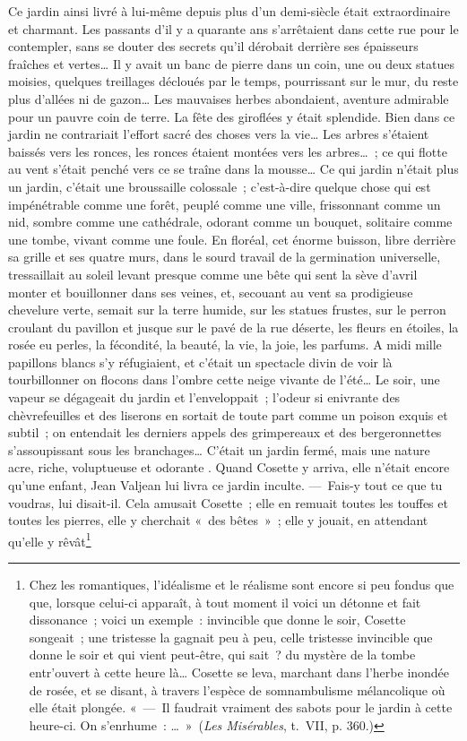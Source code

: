 \documentclass[french,twoside]{book} %
\begin{document}
Ce jardin ainsi livré à lui-même depuis plus d’un demi-siècle était extraordinaire et charmant. Les passants d’il y a quarante ans s’arrêtaient dans cette rue pour le contempler, sans se douter des secrets qu’il dérobait derrière ses épaisseurs fraîches et vertes… Il y avait un banc de pierre dans un coin, une ou deux statues moisies, quelques treillages décloués par le temps, pourrissant sur le mur, du reste plus d’allées ni de gazon… Les mauvaises herbes abondaient, aventure admirable pour un pauvre coin de terre. La fête des giroflées y était splendide. Bien dans ce jardin ne contrariait l’effort sacré des choses vers la vie… Les arbres s’étaient baissés vers les ronces, les ronces étaient montées vers les arbres… ; ce qui flotte au vent s’était penché vers ce se traîne dans la mousse… Ce qui jardin n’était plus un jardin, c’était une broussaille colossale ; c’est-à-dire quelque chose qui est impénétrable comme une forêt, peuplé comme une ville, frissonnant comme un nid, sombre comme une cathédrale, odorant comme un bouquet, solitaire comme une tombe, vivant comme une foule. En floréal, cet énorme buisson, libre derrière sa grille et ses quatre murs, dans le sourd travail de la germination universelle, tressaillait au soleil levant presque comme une bête qui sent la sève d’avril monter et bouillonner dans ses veines, et, secouant au vent sa prodigieuse chevelure verte, semait sur la terre humide, sur les statues frustes, sur le perron croulant du pavillon et jusque sur le pavé de la rue déserte, les fleurs en étoiles, la rosée eu perles, la fécondité, la beauté, la vie, la joie, les parfums. A midi mille papillons blancs s’y réfugiaient, et c’était un spectacle divin de voir là tourbillonner on flocons dans l’ombre cette neige vivante de l’été… Le soir, une vapeur se dégageait du jardin et l’enveloppait ; l’odeur si enivrante des chèvrefeuilles et des liserons en sortait de toute part comme un poison exquis et subtil ; on entendait les derniers appels des grimpereaux et des bergeronnettes s’assoupissant sous les branchages… C’était un jardin fermé, mais une nature acre, riche, voluptueuse et odorante . Quand Cosette y arriva, elle n’était encore qu’une enfant, Jean Valjean lui livra ce jardin inculte. — Fais-y tout ce que tu voudras, lui disait-il. Cela amusait Cosette ; elle en remuait toutes les touffes et toutes les pierres, elle y cherchait « des bêtes » ; elle y jouait, en attendant qu’elle y rêvât\footnote{\noindent Chez les romantiques, l’idéalisme et le réalisme sont encore si peu fondus que que, lorsque celui-ci apparaît, à tout moment il voici un détonne et fait dissonance ; voici un exemple : invincible que donne le soir, Cosette songeait ; une tristesse la gagnait peu à peu, celle tristesse invincible que donne le soir et qui vient peut-être, qui sait ? du mystère de la tombe entr’ouvert à cette heure là… Cosette se leva, marchant dans l’herbe inondée de rosée, et se disant, à travers l’espèce de somnambulisme mélancolique où elle était plongée. « — Il faudrait vraiment des sabots pour le jardin à cette heure-ci. On s’enrhume : … » (\emph{Les Misérables}, t. VII, p. 360.)\par
}
\end{document}
